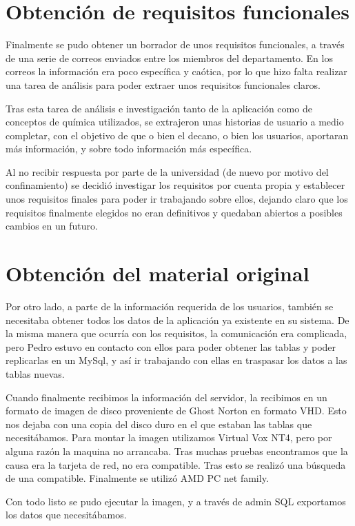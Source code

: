 \section{Obtención de requisitos funcionales}

Finalmente se pudo obtener un borrador de unos requisitos funcionales, a través de una serie de correos enviados entre los miembros del departamento. En los correos la información era poco específica y caótica, por lo que hizo falta realizar una tarea de análisis para poder extraer unos requisitos funcionales claros. 

Tras esta tarea de análisis e investigación tanto de la aplicación como de conceptos de química utilizados, se extrajeron unas historias de usuario a medio completar, con el objetivo de que o bien el decano, o bien los usuarios, aportaran más información, y sobre todo información más específica. 

Al no recibir respuesta por parte de la universidad (de nuevo por motivo del confinamiento) se decidió investigar los requisitos por cuenta propia y establecer unos requisitos finales para poder ir trabajando sobre ellos, dejando claro que los requisitos finalmente elegidos no eran definitivos y quedaban abiertos a posibles cambios en un futuro.

\section{Obtención del material original}

Por otro lado, a parte de la información requerida de los usuarios, también se necesitaba obtener todos los datos de la aplicación ya existente en su sistema. De la misma manera que ocurría con los requisitos, la comunicación era complicada, pero Pedro estuvo en contacto con ellos para poder obtener las tablas y poder replicarlas en un MySql, y así ir trabajando con ellas en traspasar los datos a las tablas nuevas.

Cuando finalmente recibimos la información del servidor, la recibimos en un formato de imagen de disco proveniente de Ghost Norton en formato VHD. Esto nos dejaba con una copia del disco duro en el que estaban las tablas que necesitábamos.
Para montar la imagen utilizamos Virtual Vox NT4, pero por alguna razón la maquina no arrancaba. Tras muchas pruebas encontramos que la causa era la tarjeta de red, no era compatible. Tras esto se realizó una búsqueda de una compatible. Finalmente se utilizó AMD PC net family. 

Con todo listo se pudo ejecutar la imagen, y a través de admin SQL exportamos los datos que necesitábamos.

